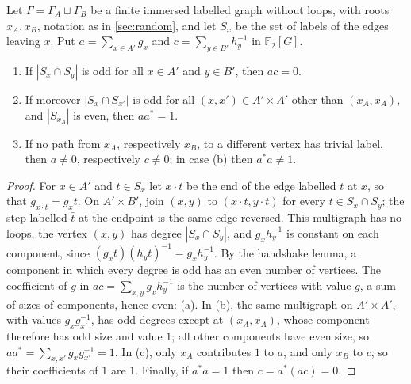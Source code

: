 \documentclass[11pt]{article}
\theoremstyle{definition}
\theoremstyle{plain}
\newcommand{\F}{\mathbb{F}}
\begin{document}
\begin{proposition}\label{prop:parity}
Let $\Gamma=\Gamma_A\sqcup\Gamma_B$ be a finite immersed labelled graph without loops, with roots $x_A,x_B$, notation as in \cref{sec:random}, and let $S_x$ be the set of labels of the edges leaving $x$. Put $a=\sum_{x\in A'}g_x$ and $c=\sum_{y\in B'}h_y^{-1}$ in $\F_2[G]$.
\begin{enumerate}[label=\textup{(\alph*)},itemsep=0pt]
\item If $|S_x\cap S_y|$ is odd for all $x\in A'$ and $y\in B'$, then $ac=0$.
\item If moreover $|S_x\cap S_{x'}|$ is odd for all $(x,x')\in A'\times A'$ other than $(x_A,x_A)$, and $|S_{x_A}|$ is even, then $aa^*=1$.
\item If no path from $x_A$, respectively $x_B$, to a different vertex has trivial label, then $a\neq0$, respectively $c\neq0$; in case \textup{(b)} then $a^*a\neq1$.
\end{enumerate}
\end{proposition}

\begin{proof}
For $x\in A'$ and $t\in S_x$ let $x\cdot t$ be the end of the edge labelled $t$ at $x$, so that $g_{x\cdot t}=g_xt$. On $A'\times B'$, join $(x,y)$ to $(x\cdot t,y\cdot t)$ for every $t\in S_x\cap S_y$; the step labelled $\bar t$ at the endpoint is the same edge reversed. This multigraph has no loops, the vertex $(x,y)$ has degree $|S_x\cap S_y|$, and $g_xh_y^{-1}$ is constant on each component, since $(g_xt)(h_yt)^{-1}=g_xh_y^{-1}$. By the handshake lemma, a component in which every degree is odd has an even number of vertices. The coefficient of $g$ in $ac=\sum_{x,y}g_xh_y^{-1}$ is the number of vertices with value $g$, a sum of sizes of components, hence even: (a). In (b), the same multigraph on $A'\times A'$, with values $g_xg_{x'}^{-1}$, has odd degrees except at $(x_A,x_A)$, whose component therefore has odd size and value $1$; all other components have even size, so $aa^*=\sum_{x,x'}g_xg_{x'}^{-1}=1$. In (c), only $x_A$ contributes $1$ to $a$, and only $x_B$ to $c$, so their coefficients of $1$ are $1$. Finally, if $a^*a=1$ then $c=a^*(ac)=0$.
\end{proof}
\end{document}
